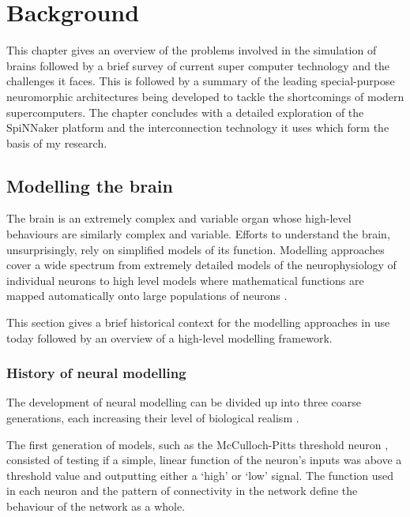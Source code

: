 \chapter{Background}
	
	This chapter gives an overview of the problems involved in the simulation of
	brains followed by a brief survey of current super computer technology and the
	challenges it faces. This is followed by a summary of the leading
	special-purpose neuromorphic architectures being developed to tackle the
	shortcomings of modern supercomputers. The chapter concludes with a detailed
	exploration of the SpiNNaker platform and the interconnection technology it
	uses which form the basis of my research.
	
	\section{Modelling the brain}
		
		
		The brain is an extremely complex and variable organ whose high-level
		behaviours are similarly complex and variable. Efforts to understand the
		brain, unsurprisingly, rely on simplified models of its function. Modelling
		approaches cover a wide spectrum from extremely detailed models of the
		neurophysiology of individual neurons \cite{carnevale06} to high level
		models where mathematical functions are mapped automatically onto large
		populations of neurons \cite{eliasmith04}.
		
		This section gives a brief historical context for the modelling approaches
		in use today followed by an overview of a high-level modelling framework.
		
		\subsection{History of neural modelling}
			
			The development of neural modelling can be divided up into three coarse
			generations, each increasing their level of biological realism
			\cite{vainbrand11}.
			
			The first generation of models, such as the McCulloch-Pitts threshold neuron
			\cite{mcculloch43}, consisted of testing if a simple, linear function of
			the neuron's inputs was above a threshold value and outputting either a
			`high' or `low' signal. The function used in each neuron and the pattern
			of connectivity in the network define the behaviour of the network as a
			whole.
			
